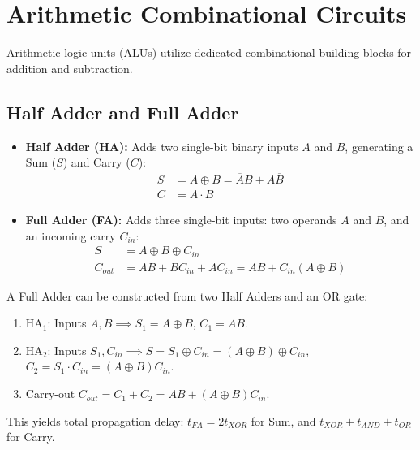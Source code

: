 \section{Arithmetic Combinational Circuits}
Arithmetic logic units (ALUs) utilize dedicated combinational building blocks for addition and subtraction.

\subsection{Half Adder and Full Adder}
\begin{itemize}
    \item \textbf{Half Adder (HA):} Adds two single-bit binary inputs $A$ and $B$, generating a Sum ($S$) and Carry ($C$):
    \begin{align}
    S &= A \oplus B = \overline{A}B + A\overline{B} \\
    C &= A \cdot B
    \end{align}
    \item \textbf{Full Adder (FA):} Adds three single-bit inputs: two operands $A$ and $B$, and an incoming carry $C_{in}$:
    \begin{align}
    S &= A \oplus B \oplus C_{in} \\
    C_{out} &= AB + B C_{in} + A C_{in} = AB + C_{in}(A \oplus B)
    \end{align}
\end{itemize}

\begin{derivationbox}
A Full Adder can be constructed from two Half Adders and an OR gate:
\begin{enumerate}
    \item $\text{HA}_1$: Inputs $A, B \implies S_1 = A \oplus B$, $C_1 = AB$.
    \item $\text{HA}_2$: Inputs $S_1, C_{in} \implies S = S_1 \oplus C_{in} = (A \oplus B) \oplus C_{in}$, $C_2 = S_1 \cdot C_{in} = (A \oplus B) C_{in}$.
    \item Carry-out $C_{out} = C_1 + C_2 = AB + (A \oplus B) C_{in}$.
\end{enumerate}
This yields total propagation delay: $t_{FA} = 2 t_{XOR}$ for Sum, and $t_{XOR} + t_{AND} + t_{OR}$ for Carry.
\end{derivationbox}


